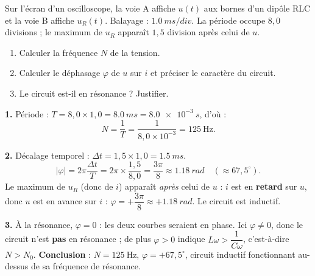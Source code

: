 \documentclass[11pt]{article}
\newcommand{\cle}[1]{{\popxbold\color{popdark}#1}}
\begin{document}
\begin{exoresolu}
Sur l'écran d'un oscilloscope, la voie A affiche $u(t)$ aux bornes d'un dipôle RLC et la voie B affiche $u_R(t)$. Balayage : $\SI{1,0}{ms/div}$. La période occupe $8{,}0$ divisions ; le maximum de $u_R$ apparaît $1{,}5$ division après celui de $u$.
\begin{enumerate}
\item Calculer la fréquence $N$ de la tension.
\item Calculer le déphasage $\varphi$ de $u$ sur $i$ et préciser le caractère du circuit.
\item Le circuit est-il en résonance ? Justifier.
\end{enumerate}
\tcblower
\textbf{1.} Période : $T = 8{,}0 \times 1{,}0 = \SI{8,0}{ms} = \SI{8,0e-3}{s}$, d'où :
\[ N = \dfrac{1}{T} = \dfrac{1}{8{,}0\times 10^{-3}} = \SI{125}{\hertz}. \]

\textbf{2.} Décalage temporel : $\Delta t = 1{,}5 \times 1{,}0 = \SI{1,5}{ms}$.
\[ |\varphi| = 2\pi\dfrac{\Delta t}{T} = 2\pi \times \dfrac{1{,}5}{8{,}0} = \dfrac{3\pi}{8} \approx \SI{1,18}{rad} \quad (\approx 67{,}5^{\circ}). \]
Le maximum de $u_R$ (donc de $i$) apparaît \emph{après} celui de $u$ : $i$ est en \textbf{retard} sur $u$, donc $u$ est en avance sur $i$ : $\varphi = +\dfrac{3\pi}{8} \approx +\SI{1,18}{rad}$. Le circuit est \cle{inductif}.

\textbf{3.} À la résonance, $\varphi = 0$ : les deux courbes seraient en phase. Ici $\varphi \neq 0$, donc le circuit n'est \textbf{pas} en résonance ; de plus $\varphi > 0$ indique $L\omega > \dfrac{1}{C\omega}$, c'est-à-dire $N > N_0$.
\textbf{Conclusion} : $N = \SI{125}{\hertz}$, $\varphi = +67{,}5^{\circ}$, circuit inductif fonctionnant au-dessus de sa fréquence de résonance.
\end{exoresolu}
\end{document}
